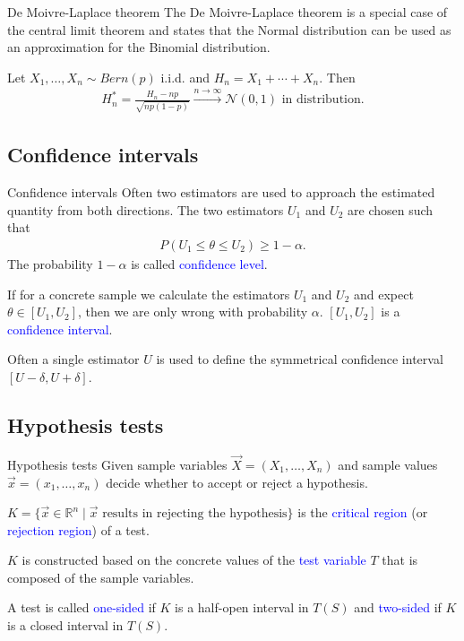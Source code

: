 \documentclass{beamer}
\def\padding{\vspace{0.5cm}}
\def\spadding{\vspace{0.25cm}}
\def\b{\textcolor{blue}}
\begin{document}
\begin{frame}
    \begin{block}{De Moivre-Laplace theorem}
        The De Moivre-Laplace theorem is a special case of the central limit theorem and states that the Normal distribution can be used as an approximation for the Binomial distribution.\pause\par\spadding
        Let $X_1, \dots, X_n \sim Bern(p)$ i.i.d. and $H_n = X_1 + \cdots + X_n$. Then
        \begin{align*}
            H_n^* = \frac{H_n - n p}{\sqrt{n p (1 - p)}} \xrightarrow{n \to \infty} \mathcal{N}(0,1) \text{ in distribution}.
        \end{align*}
    \end{block}
\end{frame}

\subsection{Confidence intervals}
\begin{frame}{Confidence intervals}
    Often two estimators are used to approach the estimated quantity from both directions.\pause
    The two estimators $U_1$ and $U_2$ are chosen such that
    \begin{align*}
        P(U_1 \leq \theta \leq U_2) \geq 1 - \alpha.
    \end{align*}\pause
    The probability $1 - \alpha$ is called \b{confidence level}.\pause\par\padding
    If for a concrete sample we calculate the estimators $U_1$ and $U_2$ and expect $\theta \in [U_1, U_2]$, then we are only wrong with probability $\alpha$. $[U_1, U_2]$ is a \b{confidence interval}.\pause\par\spadding
    Often a single estimator $U$ is used to define the symmetrical confidence interval $[U - \delta, U + \delta]$.
\end{frame}

\subsection{Hypothesis tests}
\begin{frame}{Hypothesis tests}
    Given sample variables $\overrightarrow{X} = (X_1, \dots, X_n)$ and sample values $\overrightarrow{x} = (x_1, \dots, x_n)$ decide whether to accept or reject a hypothesis.\pause\par\padding
    $K = \{\overrightarrow{x} \in \mathbb{R}^n \mid \overrightarrow{x} \text{ results in rejecting the hypothesis}\}$ is the \b{critical region} (or \b{rejection region}) of a test.\pause\par\padding
    $K$ is constructed based on the concrete values of the \b{test variable} $T$ that is composed of the sample variables.\pause\par\padding
    A test is called \b{one-sided} if $K$ is a half-open interval in $T(S)$ and \b{two-sided} if $K$ is a closed interval in $T(S)$.
\end{frame}
\end{document}
